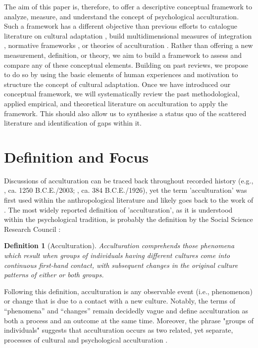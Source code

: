 \documentclass[nobib]{tufte-handout}
\newtheorem{definition}{Definition}
\begin{document}
 The aim of this paper is, therefore, to offer a descriptive conceptual framework to analyze, measure, and understand the concept of psychological acculturation. Such a framework has a different objective than previous efforts to catalogue literature on cultural adaptation \citep[e.g.,][]{Castels2003}, build multidimensional measures of integration \citep[e.g.,][]{Harder2018}, normative frameworks \citep[e.g.,][]{Ager2008a}, or theories of acculturation \citep[e.g.,][]{Berry2005}. Rather than offering a new measurement, definition, or theory, we aim to build a framework to assess and compare any of these conceptual elements. 
Building on past reviews, we propose to do so by using the basic elements of human experiences and motivation to structure the concept of cultural adaptation.
Once we have introduced our conceptual framework, we will systematically review the past methodological, applied empirical, and theoretical literature on acculturation to apply the framework. This should also allow us to synthesise a status quo of the scattered literature and identification of gaps within it.

\section{Definition and Focus}\label{sec:definition}
Discussions of acculturation can be traced back throughout recorded history (e.g., \citeauthor{Ipuwer2003}, ca. 1250 B.C.E./2003; \citeauthor{Plato1926}, ca. 384 B.C.E./1926), yet the term 'acculturation' was first used within the anthropological literature and likely goes back to the work of \citet{Powell1880}. The most widely reported definition of 'acculturation', as it is understood within the psychological tradition, is probably the definition by the Social Science Research Council \citep[][p. 149]{Redfield1936}:
\begin{framed}
    \begin{definition}[Acculturation]
        Acculturation comprehends those phenomena which result when groups of individuals having different cultures come into continuous first-hand contact, with subsequent changes in the original culture patterns of either or both groups.
    \end{definition}  
\end{framed}
Following this definition, acculturation is any observable event (i.e., phenomenon) or change that is due to a contact with a new culture. Notably, the terms of “phenomena” and “changes” remain decidedly vague and define acculturation as both a process and an outcome at the same time. Moreover, the phrase "groups of individuals" suggests that acculturation occurs as two related, yet separate, processes of cultural and psychological acculturation \citep[also see,][]{Sam2006b, Berry2005}.
\end{document}
